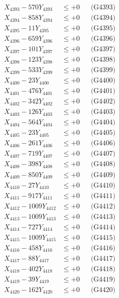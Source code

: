 \documentclass[a4paper,10pt]{article}
\begin{document}
{\begin{align}
X_{4393} - 570Y_{4393} &\leq +0 && \text{(G4393)} \\
X_{4394} - 858Y_{4394} &\leq +0 && \text{(G4394)} \\
X_{4395} - 11Y_{4395} &\leq +0 && \text{(G4395)} \\
X_{4396} - 659Y_{4396} &\leq +0 && \text{(G4396)} \\
X_{4397} - 101Y_{4397} &\leq +0 && \text{(G4397)} \\
X_{4398} - 123Y_{4398} &\leq +0 && \text{(G4398)} \\
X_{4399} - 533Y_{4399} &\leq +0 && \text{(G4399)} \\
X_{4400} - 23Y_{4400} &\leq +0 && \text{(G4400)} \\
\allowbreak
X_{4401} - 476Y_{4401} &\leq +0 && \text{(G4401)} \\
X_{4402} - 342Y_{4402} &\leq +0 && \text{(G4402)} \\
X_{4403} - 126Y_{4403} &\leq +0 && \text{(G4403)} \\
X_{4404} - 564Y_{4404} &\leq +0 && \text{(G4404)} \\
X_{4405} - 23Y_{4405} &\leq +0 && \text{(G4405)} \\
X_{4406} - 261Y_{4406} &\leq +0 && \text{(G4406)} \\
X_{4407} - 719Y_{4407} &\leq +0 && \text{(G4407)} \\
X_{4408} - 398Y_{4408} &\leq +0 && \text{(G4408)} \\
X_{4409} - 850Y_{4409} &\leq +0 && \text{(G4409)} \\
X_{4410} - 27Y_{4410} &\leq +0 && \text{(G4410)} \\
\allowbreak
X_{4411} - 917Y_{4411} &\leq +0 && \text{(G4411)} \\
X_{4412} - 1009Y_{4412} &\leq +0 && \text{(G4412)} \\
X_{4413} - 1009Y_{4413} &\leq +0 && \text{(G4413)} \\
X_{4414} - 727Y_{4414} &\leq +0 && \text{(G4414)} \\
X_{4415} - 1009Y_{4415} &\leq +0 && \text{(G4415)} \\
X_{4416} - 458Y_{4416} &\leq +0 && \text{(G4416)} \\
X_{4417} - 88Y_{4417} &\leq +0 && \text{(G4417)} \\
X_{4418} - 402Y_{4418} &\leq +0 && \text{(G4418)} \\
X_{4419} - 39Y_{4419} &\leq +0 && \text{(G4419)} \\
X_{4420} - 162Y_{4420} &\leq +0 && \text{(G4420)} \\

\end{align}}
\end{document}
